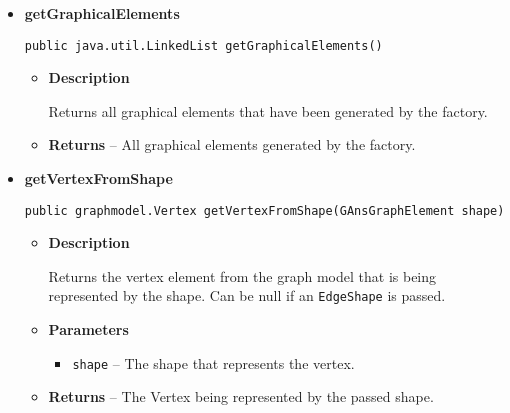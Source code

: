 {{{{{{{{{\begin{itemize}
{\begin{itemize}
{Returns the edge element from the graph model that is being represented by the shape. Can be null if an \texttt{\small VertexShape}{\small 
{}} is passed.
}
\item{
{\bf  Parameters}
  \begin{itemize}
   \item{
\texttt{shape} -- The shape that represents the edge.}
  \end{itemize}
}%
\item{{\bf  Returns} -- 
The Edge being represented by the passed shape. 
}%
\end{itemize}
}%
\item{ 
{\bf  getGraphicalElements}\\
\begin{lstlisting}[frame=none]
public java.util.LinkedList getGraphicalElements()\end{lstlisting} %
\begin{itemize}
\item{
{\bf  Description}

Returns all graphical elements that have been generated by the factory.
}
\item{{\bf  Returns} -- 
All graphical elements generated by the factory. 
}%
\end{itemize}
}%
\item{ 
{\bf  getVertexFromShape}\\
\begin{lstlisting}[frame=none]
public graphmodel.Vertex getVertexFromShape(GAnsGraphElement shape)\end{lstlisting} %
\begin{itemize}
\item{
{\bf  Description}

Returns the vertex element from the graph model that is being represented by the shape. Can be null if an \texttt{\small EdgeShape}{\small 
{}} is passed.
}
\item{
{\bf  Parameters}
  \begin{itemize}
   \item{
\texttt{shape} -- The shape that represents the vertex.}
  \end{itemize}
}%
\item{{\bf  Returns} -- 
The Vertex being represented by the passed shape. 
}%
\end{itemize}
}%
\end{itemize}
}
}
}}}}}}}
